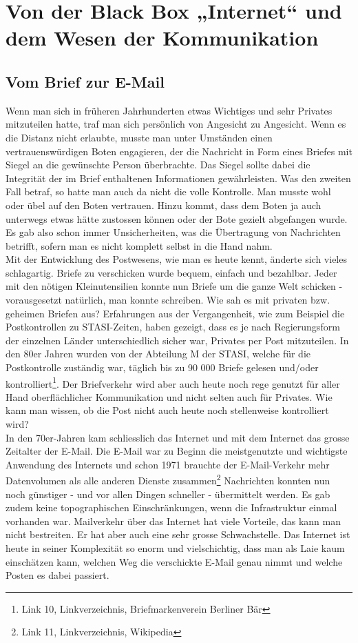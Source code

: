 \section{Von der Black Box „Internet“ und dem Wesen der Kommunikation}

\subsection{Vom Brief zur E-Mail}
Wenn man sich in früheren Jahrhunderten etwas Wichtiges und sehr Privates mitzuteilen hatte, traf man sich persönlich von Angesicht zu Angesicht. Wenn es die Distanz nicht erlaubte, musste man unter Umständen einen vertrauenswürdigen Boten engagieren, der die Nachricht in Form eines Briefes mit Siegel an die gewünschte Person überbrachte. Das Siegel sollte dabei die Integrität der im Brief enthaltenen Informationen gewährleisten. Was den zweiten Fall betraf, so hatte man auch da nicht die volle Kontrolle. Man musste wohl oder übel auf den Boten vertrauen. Hinzu kommt, dass dem Boten ja auch unterwegs etwas hätte zustossen können oder der Bote gezielt abgefangen wurde. Es gab also schon immer Unsicherheiten, was die Übertragung von Nachrichten betrifft, sofern man es nicht komplett selbst in die Hand nahm.
\\
Mit der Entwicklung des Postwesens, wie man es heute kennt, änderte sich vieles schlagartig. Briefe zu verschicken wurde bequem, einfach und bezahlbar. Jeder mit den nötigen Kleinutensilien konnte nun Briefe um die ganze Welt schicken - vorausgesetzt natürlich, man konnte schreiben. Wie sah es mit privaten bzw. geheimen Briefen aus? Erfahrungen aus der Vergangenheit, wie zum Beispiel die Postkontrollen zu STASI-Zeiten, haben gezeigt, dass es je nach Regierungsform der einzelnen Länder unterschiedlich sicher war, Privates per Post mitzuteilen. In den 80er Jahren wurden von der Abteilung M der STASI, welche für die Postkontrolle zuständig war, täglich bis zu 90 000 Briefe gelesen und/oder kontrolliert\footnote{Link 10, Linkverzeichnis, Briefmarkenverein Berliner Bär}.
Der Briefverkehr wird aber auch heute noch rege genutzt für aller Hand oberflächlicher Kommunikation und nicht selten auch für Privates. Wie kann man wissen, ob die Post nicht auch heute noch stellenweise kontrolliert wird?
\\
In den 70er-Jahren kam schliesslich das Internet und mit dem Internet das grosse Zeitalter der E-Mail. Die E-Mail war zu Beginn die meistgenutzte und wichtigste Anwendung des Internets und schon 1971 brauchte der E-Mail-Verkehr mehr Datenvolumen als alle anderen Dienste zusammen\footnote{Link 11, Linkverzeichnis, Wikipedia}
Nachrichten konnten nun noch günstiger - und vor allen Dingen schneller - übermittelt werden. Es gab zudem keine topographischen Einschränkungen, wenn die Infrastruktur einmal vorhanden war. Mailverkehr über das Internet hat viele Vorteile, das kann man nicht bestreiten. Er hat aber auch eine sehr grosse Schwachstelle. Das Internet ist heute in seiner Komplexität so enorm und vielschichtig, dass man als Laie kaum einschätzen kann, welchen Weg die verschickte E-Mail genau nimmt und welche Posten es dabei passiert.

